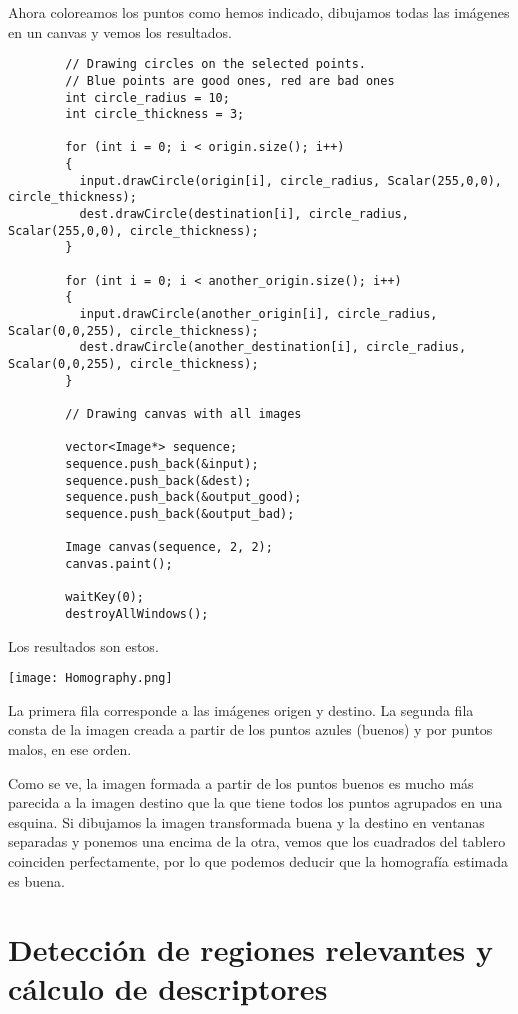 \documentclass[a4paper, 11pt]{article}
\theoremstyle{definition}
\begin{document}
      Ahora coloreamos los puntos como hemos indicado, dibujamos todas las imágenes en un canvas y vemos los resultados.

      \begin{lstlisting}
        // Drawing circles on the selected points.
        // Blue points are good ones, red are bad ones
        int circle_radius = 10;
        int circle_thickness = 3;

        for (int i = 0; i < origin.size(); i++)
        {
          input.drawCircle(origin[i], circle_radius, Scalar(255,0,0), circle_thickness);
          dest.drawCircle(destination[i], circle_radius, Scalar(255,0,0), circle_thickness);
        }

        for (int i = 0; i < another_origin.size(); i++)
        {
          input.drawCircle(another_origin[i], circle_radius, Scalar(0,0,255), circle_thickness);
          dest.drawCircle(another_destination[i], circle_radius, Scalar(0,0,255), circle_thickness);
        }

        // Drawing canvas with all images

        vector<Image*> sequence;
        sequence.push_back(&input);
        sequence.push_back(&dest);
        sequence.push_back(&output_good);
        sequence.push_back(&output_bad);

        Image canvas(sequence, 2, 2);
        canvas.paint();

        waitKey(0);
        destroyAllWindows();
      \end{lstlisting}

      Los resultados son estos.

      \centerline{\texttt{[image: Homography.png]}}

      La primera fila corresponde a las imágenes origen y destino. La segunda fila consta
      de la imagen creada a partir de los puntos azules (buenos) y por puntos malos, en ese orden.

      Como se ve, la imagen formada a partir de los puntos buenos es mucho más parecida a la imagen
      destino que la que tiene todos los puntos agrupados en una esquina. Si dibujamos la imagen transformada buena
      y la destino en ventanas separadas y ponemos una encima de la otra, vemos que los cuadrados
      del tablero coinciden perfectamente, por lo que podemos deducir que la homografía estimada es buena.


  \section{Detección de regiones relevantes y cálculo de descriptores}
\end{document}

